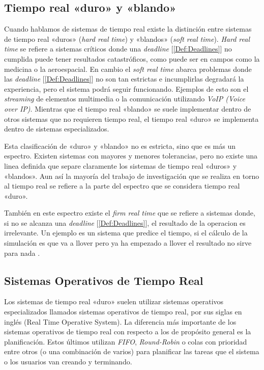 \subsection{Tiempo real «duro» y «blando»}
Cuando hablamos de sistemas de tiempo real existe la distinción entre sistemas de tiempo real «duros» (\emph{hard real time}) y «blandos» (\emph{soft real time}). \emph{Hard real time} se refiere a sistemas críticos donde una \emph{deadline} [\ref{Def:Deadlines}] no cumplida puede tener resultados catastróficos, como puede ser en campos como la medicina o la aeroespacial. En cambio el \emph{soft real time} abarca problemas donde las \emph{deadline} [\ref{Def:Deadlines}] no son tan estrictas e incumplirlas degradará la experiencia, pero el sistema podrá seguir funcionando. Ejemplos de esto son el \emph{streaming} de elementos multimedia o la comunicación utilizando \emph{VoIP (Voice over IP)}. Mientras que el tiempo real «blando» se suele implementar dentro de otros sistemas que no requieren tiempo real, el tiempo real «duro» se implementa dentro de sistemas especializados.


Esta clasificación de «duro» y «blando» no es estricta, sino que es más un espectro. Existen sistemas con mayores y menores tolerancias, pero no existe una linea definida que separe claramente los sistemas de tiempo real «duros» y «blandos». Aun así la mayoría del trabajo de investigación que se realiza en torno al tiempo real se refiere a la parte del espectro que se considera tiempo real «duro».

También en este espectro existe el \emph{firm real time} que se refiere a sistemas donde, si no se alcanza una \emph{deadline} [\ref{Def:Deadlines}], el resultado de la operacion es irrelevante. Un ejemplo es un sistema que predice el tiempo, si el cálculo de la simulación es que va a llover pero ya ha empezado a llover el resultado no sirve para nada \cite{wang2017rtes}.

\subsection{Sistemas Operativos de Tiempo Real}
Los sistemas de tiempo real «duro» suelen utilizar sistemas operativos especializados llamados sistemas operativos de tiempo real,  por sus siglas en inglés (Real Time Operative System).
La diferencia más importante de los sistemas operativos de tiempo real con respecto a los de propósito general es la planificación. Estos últimos utilizan \emph{FIFO}, \emph{Round-Robin} o colas con prioridad entre otros (o una combinación de varios) para planificar las tareas que el sistema o los usuarios van creando y terminando.

